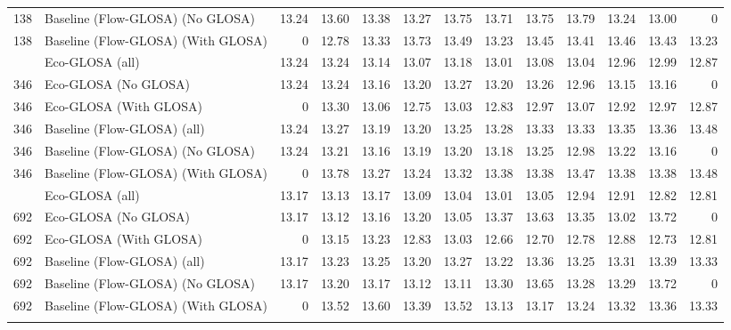 \begin{table}[ht]
{\begin{tabular}{llrrrrrrrrrrr}
        138  & Baseline (Flow-GLOSA) (No GLOSA)   & 13.24 & 13.60 & 13.38 & 13.27 & 13.75 & 13.71 & 13.75 & 13.79 & 13.24 & 13.00 & 0     \\
        138  & Baseline (Flow-GLOSA) (With GLOSA) & 0     & 12.78 & 13.33 & 13.73 & 13.49 & 13.23 & 13.45 & 13.41 & 13.46 & 13.43 & 13.23 \\
        \addlinespace
        346  & Eco-GLOSA (all)                    & 13.24 & 13.24 & 13.14 & 13.07 & 13.18 & 13.01 & 13.08 & 13.04 & 12.96 & 12.99 & 12.87 \\
        346  & Eco-GLOSA (No GLOSA)               & 13.24 & 13.24 & 13.16 & 13.20 & 13.27 & 13.20 & 13.26 & 12.96 & 13.15 & 13.16 & 0     \\
        346  & Eco-GLOSA (With GLOSA)             & 0     & 13.30 & 13.06 & 12.75 & 13.03 & 12.83 & 12.97 & 13.07 & 12.92 & 12.97 & 12.87 \\
        346  & Baseline (Flow-GLOSA) (all)        & 13.24 & 13.27 & 13.19 & 13.20 & 13.25 & 13.28 & 13.33 & 13.33 & 13.35 & 13.36 & 13.48 \\
        346  & Baseline (Flow-GLOSA) (No GLOSA)   & 13.24 & 13.21 & 13.16 & 13.19 & 13.20 & 13.18 & 13.25 & 12.98 & 13.22 & 13.16 & 0     \\
        346  & Baseline (Flow-GLOSA) (With GLOSA) & 0     & 13.78 & 13.27 & 13.24 & 13.32 & 13.38 & 13.38 & 13.47 & 13.38 & 13.38 & 13.48 \\
        \addlinespace
        692  & Eco-GLOSA (all)                    & 13.17 & 13.13 & 13.17 & 13.09 & 13.04 & 13.01 & 13.05 & 12.94 & 12.91 & 12.82 & 12.81 \\
        692  & Eco-GLOSA (No GLOSA)               & 13.17 & 13.12 & 13.16 & 13.20 & 13.05 & 13.37 & 13.63 & 13.35 & 13.02 & 13.72 & 0     \\
        692  & Eco-GLOSA (With GLOSA)             & 0     & 13.15 & 13.23 & 12.83 & 13.03 & 12.66 & 12.70 & 12.78 & 12.88 & 12.73 & 12.81 \\
        692  & Baseline (Flow-GLOSA) (all)        & 13.17 & 13.23 & 13.25 & 13.20 & 13.27 & 13.22 & 13.36 & 13.25 & 13.31 & 13.39 & 13.33 \\
        692  & Baseline (Flow-GLOSA) (No GLOSA)   & 13.17 & 13.20 & 13.17 & 13.12 & 13.11 & 13.30 & 13.65 & 13.28 & 13.29 & 13.72 & 0     \\
        692  & Baseline (Flow-GLOSA) (With GLOSA) & 0     & 13.52 & 13.60 & 13.39 & 13.52 & 13.13 & 13.17 & 13.24 & 13.32 & 13.36 & 13.33 \\
        \addlinespace

\end{tabular}}
\end{table}
